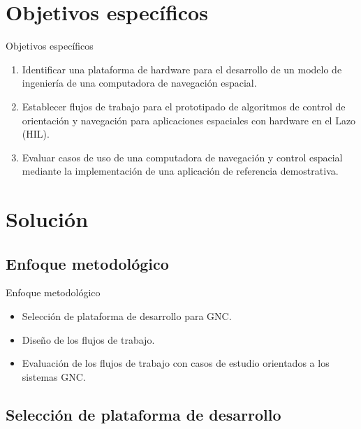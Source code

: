 \documentclass[10pt,aspectratio=169]{beamer} %
\begin{document}
\section{Objetivos específicos}
\begin{frame}{Objetivos específicos}
  \begin{enumerate}
    \item Identificar una plataforma de hardware para el desarrollo de un modelo de ingeniería de una computadora de navegación espacial.
    \item Establecer flujos de trabajo para el prototipado de algoritmos de control de orientación y navegación para aplicaciones espaciales 
          con hardware en el Lazo (HIL).
    \item Evaluar casos de uso de una computadora de navegación y control espacial mediante la implementación de una aplicación de 
          referencia demostrativa.
  \end{enumerate}
\end{frame}

\section{Solución}

\subsection{Enfoque metodológico}

\begin{frame}{Enfoque metodológico}
  \begin{itemize}
    \item Selección de plataforma de desarrollo para GNC.
    \item Diseño de los flujos de trabajo.
    \item Evaluación de los flujos de trabajo con casos de estudio orientados a los sistemas GNC.
  \end{itemize}
\end{frame}


\subsection{Selección de plataforma de desarrollo}
\end{document}
